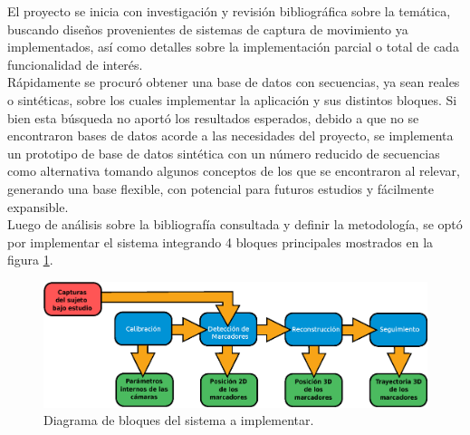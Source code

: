 \vspace{5 mm}

El proyecto se inicia con investigación y revisión bibliográfica sobre la temática, buscando diseños provenientes de sistemas de captura de movimiento ya implementados, así como  detalles sobre la implementación parcial o total de cada funcionalidad de interés. 
\\ 

Rápidamente se procuró obtener una base de datos con secuencias, ya sean reales o sintéticas, sobre los cuales implementar la aplicación y sus distintos bloques. Si bien esta búsqueda no aportó los resultados esperados,
 debido a que no se encontraron bases de datos acorde a las necesidades del proyecto, se implementa un prototipo de base de datos sintética con un número reducido de secuencias como alternativa tomando algunos conceptos de los que se encontraron al relevar, generando una base flexible, con potencial para futuros estudios y fácilmente expansible.
\\ 

 Luego de análisis sobre la bibliografía consultada y definir la metodología, se optó por implementar el sistema integrando 4 bloques principales mostrados en la figura \ref{bloquesSistintro}. 

 \begin{figure}[H]
\begin{center}
\includegraphics[scale=0.8]{img/Sistema_completo/Diagrama_de_bloques.eps}
\end{center}
\caption{Diagrama de bloques del sistema a implementar.}
\label{bloquesSistintro}
\end{figure}

